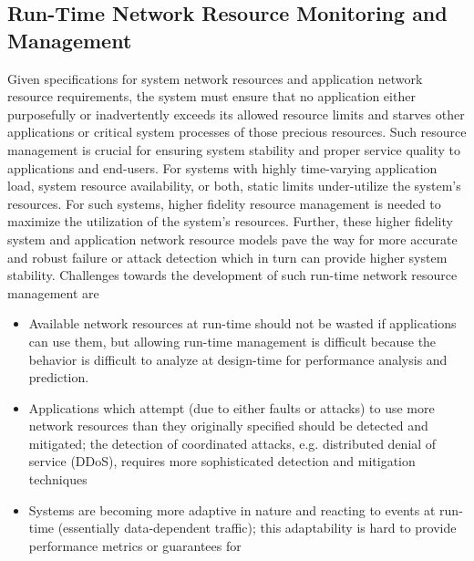 \subsection{Run-Time Network Resource Monitoring and Management}
Given specifications for system network resources and application
network resource requirements, the system must ensure that no
application either purposefully or inadvertently exceeds its allowed
resource limits and starves other applications or critical system
processes of those precious resources.  Such resource management is
crucial for ensuring system stability and proper service quality to
applications and end-users.  For systems with highly time-varying
application load, system resource availability, or both, static limits
under-utilize the system's resources.  For such systems, higher
fidelity resource management is needed to maximize the utilization of
the system's resources.  Further, these higher fidelity system and
application network resource models pave the way for more accurate and
robust failure or attack detection which in turn can provide higher
system stability.  Challenges towards the development of such run-time
network resource management are
\begin{itemize}
\item Available network resources at run-time should not be wasted if
  applications can use them, but allowing run-time management is
  difficult because the behavior is difficult to analyze at
  design-time for performance analysis and prediction.
\item Applications which attempt (due to either faults or attacks) to
  use more network resources than they originally specified should be
  detected and mitigated; the detection of coordinated attacks,
  e.g. distributed denial of service (DDoS), requires more
  sophisticated detection and mitigation techniques
\item Systems are becoming more adaptive in nature and reacting to
  events at run-time (essentially data-dependent traffic); this
  adaptability is hard to provide performance metrics or guarantees
  for
\end{itemize}

